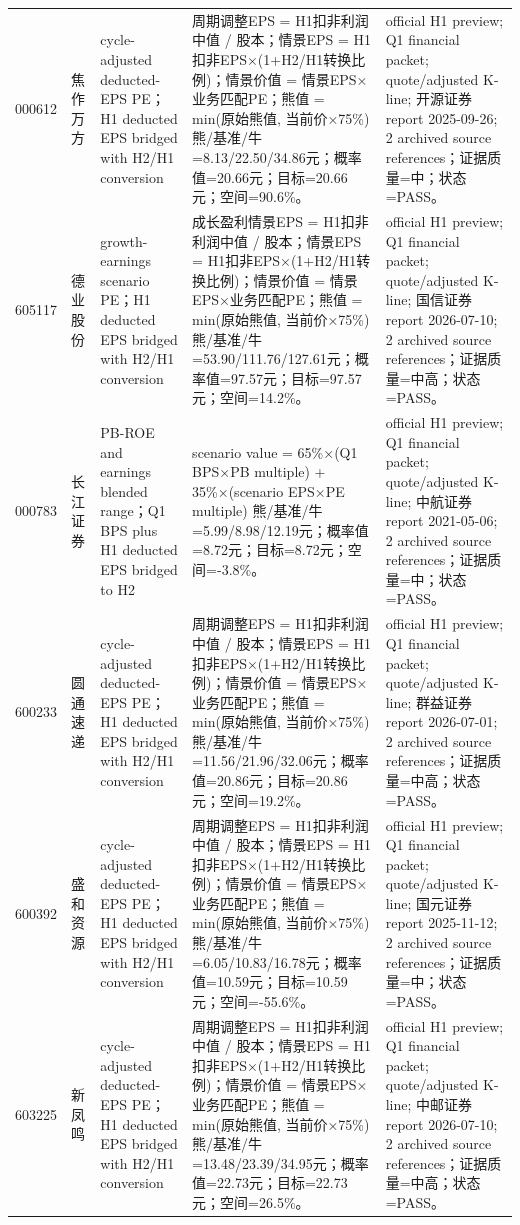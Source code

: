 \begin{longtable}{L{0.85cm}L{1.55cm}L{2.25cm}L{6.0cm}L{4.0cm}}
000612 & 焦作万方 & cycle-adjusted deducted-EPS PE；H1 deducted EPS bridged with H2/H1 conversion & 周期调整EPS = H1扣非利润中值 / 股本；情景EPS = H1扣非EPS×(1+H2/H1转换比例)；情景价值 = 情景EPS×业务匹配PE；熊值 = min(原始熊值, 当前价×75\%) 熊/基准/牛=8.13/22.50/34.86元；概率值=20.66元；目标=20.66元；空间=90.6\%。 & official H1 preview; Q1 financial packet; quote/adjusted K-line; 开源证券 report 2025-09-26; 2 archived source references；证据质量=中；状态=PASS。 \\
605117 & 德业股份 & growth-earnings scenario PE；H1 deducted EPS bridged with H2/H1 conversion & 成长盈利情景EPS = H1扣非利润中值 / 股本；情景EPS = H1扣非EPS×(1+H2/H1转换比例)；情景价值 = 情景EPS×业务匹配PE；熊值 = min(原始熊值, 当前价×75\%) 熊/基准/牛=53.90/111.76/127.61元；概率值=97.57元；目标=97.57元；空间=14.2\%。 & official H1 preview; Q1 financial packet; quote/adjusted K-line; 国信证券 report 2026-07-10; 2 archived source references；证据质量=中高；状态=PASS。 \\
000783 & 长江证券 & PB-ROE and earnings blended range；Q1 BPS plus H1 deducted EPS bridged to H2 & scenario value = 65\%×(Q1 BPS×PB multiple) + 35\%×(scenario EPS×PE multiple) 熊/基准/牛=5.99/8.98/12.19元；概率值=8.72元；目标=8.72元；空间=-3.8\%。 & official H1 preview; Q1 financial packet; quote/adjusted K-line; 中航证券 report 2021-05-06; 2 archived source references；证据质量=中；状态=PASS。 \\
600233 & 圆通速递 & cycle-adjusted deducted-EPS PE；H1 deducted EPS bridged with H2/H1 conversion & 周期调整EPS = H1扣非利润中值 / 股本；情景EPS = H1扣非EPS×(1+H2/H1转换比例)；情景价值 = 情景EPS×业务匹配PE；熊值 = min(原始熊值, 当前价×75\%) 熊/基准/牛=11.56/21.96/32.06元；概率值=20.86元；目标=20.86元；空间=19.2\%。 & official H1 preview; Q1 financial packet; quote/adjusted K-line; 群益证券 report 2026-07-01; 2 archived source references；证据质量=中高；状态=PASS。 \\
600392 & 盛和资源 & cycle-adjusted deducted-EPS PE；H1 deducted EPS bridged with H2/H1 conversion & 周期调整EPS = H1扣非利润中值 / 股本；情景EPS = H1扣非EPS×(1+H2/H1转换比例)；情景价值 = 情景EPS×业务匹配PE；熊值 = min(原始熊值, 当前价×75\%) 熊/基准/牛=6.05/10.83/16.78元；概率值=10.59元；目标=10.59元；空间=-55.6\%。 & official H1 preview; Q1 financial packet; quote/adjusted K-line; 国元证券 report 2025-11-12; 2 archived source references；证据质量=中；状态=PASS。 \\
603225 & 新凤鸣 & cycle-adjusted deducted-EPS PE；H1 deducted EPS bridged with H2/H1 conversion & 周期调整EPS = H1扣非利润中值 / 股本；情景EPS = H1扣非EPS×(1+H2/H1转换比例)；情景价值 = 情景EPS×业务匹配PE；熊值 = min(原始熊值, 当前价×75\%) 熊/基准/牛=13.48/23.39/34.95元；概率值=22.73元；目标=22.73元；空间=26.5\%。 & official H1 preview; Q1 financial packet; quote/adjusted K-line; 中邮证券 report 2026-07-10; 2 archived source references；证据质量=中高；状态=PASS。 \\

\end{longtable}
